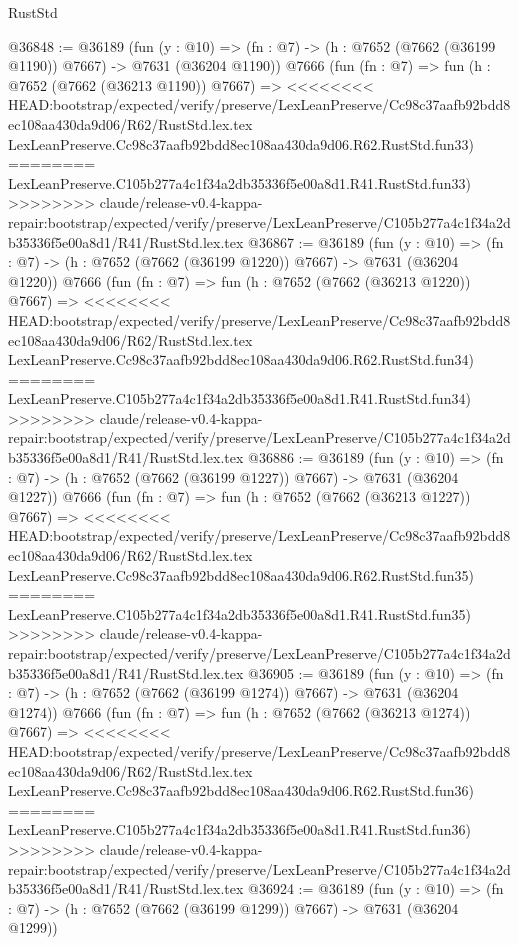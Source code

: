 \begin{lexlean}{RustStd}
\begin{coremodule}
{\begin{coremodule}
{{{{{{{{{{{{{{{{{{{{{{{{{{{{{{{{{{{{{{{{{{{{{{{{{{{{{@36848 := @36189
    (fun (y : @10) => (fn : @7) -> (h : @7652 (@7662 (@36199 @1190)) @7667) -> @7631 (@36204 @1190))
    @7666
    (fun (fn : @7) =>
    fun (h : @7652 (@7662 (@36213 @1190)) @7667) =>
<<<<<<<< HEAD:bootstrap/expected/verify/preserve/LexLeanPreserve/Cc98c37aafb92bdd8ec108aa430da9d06/R62/RustStd.lex.tex
    LexLeanPreserve.Cc98c37aafb92bdd8ec108aa430da9d06.R62.RustStd.fun33)
========
    LexLeanPreserve.C105b277a4c1f34a2db35336f5e00a8d1.R41.RustStd.fun33)
>>>>>>>> claude/release-v0.4-kappa-repair:bootstrap/expected/verify/preserve/LexLeanPreserve/C105b277a4c1f34a2db35336f5e00a8d1/R41/RustStd.lex.tex
@36867 := @36189
    (fun (y : @10) => (fn : @7) -> (h : @7652 (@7662 (@36199 @1220)) @7667) -> @7631 (@36204 @1220))
    @7666
    (fun (fn : @7) =>
    fun (h : @7652 (@7662 (@36213 @1220)) @7667) =>
<<<<<<<< HEAD:bootstrap/expected/verify/preserve/LexLeanPreserve/Cc98c37aafb92bdd8ec108aa430da9d06/R62/RustStd.lex.tex
    LexLeanPreserve.Cc98c37aafb92bdd8ec108aa430da9d06.R62.RustStd.fun34)
========
    LexLeanPreserve.C105b277a4c1f34a2db35336f5e00a8d1.R41.RustStd.fun34)
>>>>>>>> claude/release-v0.4-kappa-repair:bootstrap/expected/verify/preserve/LexLeanPreserve/C105b277a4c1f34a2db35336f5e00a8d1/R41/RustStd.lex.tex
@36886 := @36189
    (fun (y : @10) => (fn : @7) -> (h : @7652 (@7662 (@36199 @1227)) @7667) -> @7631 (@36204 @1227))
    @7666
    (fun (fn : @7) =>
    fun (h : @7652 (@7662 (@36213 @1227)) @7667) =>
<<<<<<<< HEAD:bootstrap/expected/verify/preserve/LexLeanPreserve/Cc98c37aafb92bdd8ec108aa430da9d06/R62/RustStd.lex.tex
    LexLeanPreserve.Cc98c37aafb92bdd8ec108aa430da9d06.R62.RustStd.fun35)
========
    LexLeanPreserve.C105b277a4c1f34a2db35336f5e00a8d1.R41.RustStd.fun35)
>>>>>>>> claude/release-v0.4-kappa-repair:bootstrap/expected/verify/preserve/LexLeanPreserve/C105b277a4c1f34a2db35336f5e00a8d1/R41/RustStd.lex.tex
@36905 := @36189
    (fun (y : @10) => (fn : @7) -> (h : @7652 (@7662 (@36199 @1274)) @7667) -> @7631 (@36204 @1274))
    @7666
    (fun (fn : @7) =>
    fun (h : @7652 (@7662 (@36213 @1274)) @7667) =>
<<<<<<<< HEAD:bootstrap/expected/verify/preserve/LexLeanPreserve/Cc98c37aafb92bdd8ec108aa430da9d06/R62/RustStd.lex.tex
    LexLeanPreserve.Cc98c37aafb92bdd8ec108aa430da9d06.R62.RustStd.fun36)
========
    LexLeanPreserve.C105b277a4c1f34a2db35336f5e00a8d1.R41.RustStd.fun36)
>>>>>>>> claude/release-v0.4-kappa-repair:bootstrap/expected/verify/preserve/LexLeanPreserve/C105b277a4c1f34a2db35336f5e00a8d1/R41/RustStd.lex.tex
@36924 := @36189
    (fun (y : @10) => (fn : @7) -> (h : @7652 (@7662 (@36199 @1299)) @7667) -> @7631 (@36204 @1299))
}}}}}}}}}}}}}}}}}}}}}}}}}}}}}}}}}}}}}}}}}}}}}}}}}}}}}
\end{coremodule}}
\end{coremodule}
\end{lexlean}
